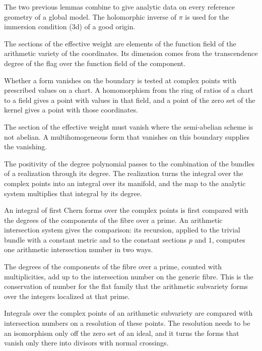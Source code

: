 The two previous lemmas combine to give analytic data on every reference geometry of a global model. The
holomorphic inverse of $\pi$ is used for the immersion condition (3d) of a good origin.

The sections of the effective weight are elements of the function field of the arithmetic variety of the
coordinates. Its dimension comes from the transcendence degree of the flag over the function field of the
component.

Whether a form vanishes on the boundary is tested at complex points with prescribed values on a chart. A homomorphism
from the ring of ratios of a chart to a field gives a point with values in that field, and a point of the zero set of
the kernel gives a point with those coordinates.

The section of the effective weight must vanish where the semi-abelian scheme is not abelian. A multihomogeneous
form that vanishes on this boundary supplies the vanishing.

The positivity of the degree polynomial passes to the combination of the bundles of a realization through its
degree. The realization turns the integral over the complex points into an integral over its manifold, and the
map to the analytic system multiplies that integral by its degree.

An integral of first Chern forms over the complex points is first compared with the degrees of the components of
the fibre over a prime. An arithmetic intersection system gives the comparison: its recursion, applied to the
trivial bundle with a constant metric and to the constant sections $p$ and $1$, computes one arithmetic
intersection number in two ways.

The degrees of the components of the fibre over a prime, counted with multiplicities, add up to the intersection
number on the generic fibre. This is the conservation of number for the flat family that the arithmetic
subvariety forms over the integers localized at that prime.

Integrals over the complex points of an arithmetic subvariety are compared with intersection numbers on a
resolution of these points. The resolution needs to be an isomorphism only off the zero set of an ideal, and it
turns the forms that vanish only there into divisors with normal crossings.

